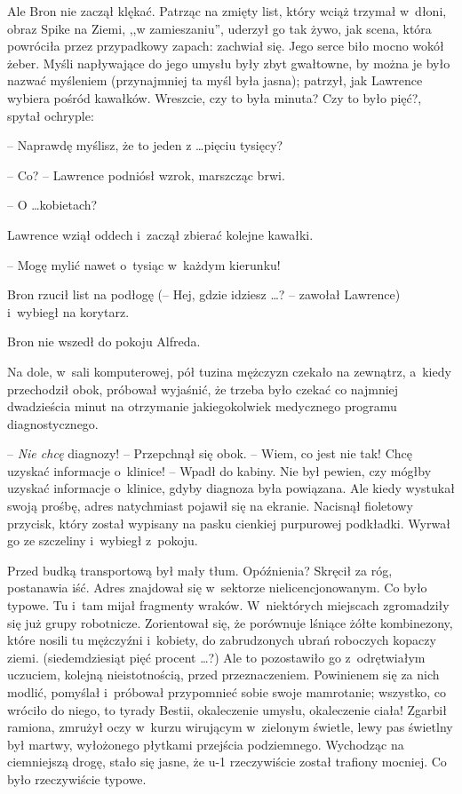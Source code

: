 \documentclass[oneside,polish,11pt,rmheadings]{mwbk}
\begin{document}
Ale Bron nie zaczął klękać. Patrząc na zmięty list, który wciąż trzymał w~dłoni, obraz Spike na Ziemi, ,,w zamieszaniu'', uderzył go tak żywo, jak scena, która powróciła przez przypadkowy zapach: zachwiał się. Jego serce biło mocno wokół żeber. Myśli napływające do jego umysłu były zbyt gwałtowne, by można je było nazwać myśleniem (przynajmniej ta myśl była jasna); patrzył, jak Lawrence wybiera pośród kawałków. Wreszcie, czy to była minuta? Czy to było pięć?, spytał ochryple: 

-- Naprawdę myślisz, że to jeden z \ldots  pięciu tysięcy? 

-- Co? -- Lawrence podniósł wzrok, marszcząc brwi.  

-- O \ldots  kobietach?   

Lawrence wziął oddech i~zaczął zbierać kolejne kawałki. 

-- Mogę mylić nawet o~tysiąc w~każdym kierunku!  

Bron rzucił list na podłogę (-- Hej, gdzie idziesz \ldots ? -- zawołał Lawrence) i~wybiegł na korytarz. 

Bron nie wszedł do pokoju Alfreda. 

Na dole, w~sali komputerowej, pół tuzina mężczyzn czekało na zewnątrz, a~kiedy przechodził obok, próbował wyjaśnić, że trzeba było czekać co najmniej dwadzieścia minut na otrzymanie jakiegokolwiek medycznego programu diagnostycznego. 

-- \textit{Nie chcę }diagnozy! --  Przepchnął się obok. --  Wiem, co jest nie tak! Chcę uzyskać informacje o~klinice! -- Wpadł do kabiny. Nie był pewien, czy mógłby uzyskać informacje o~klinice, gdyby diagnoza była powiązana. Ale kiedy wystukał swoją prośbę, adres natychmiast pojawił się na ekranie. Nacisnął fioletowy przycisk, który został wypisany na pasku cienkiej purpurowej podkładki. Wyrwał go ze szczeliny i~wybiegł z~pokoju. 

Przed budką transportową był mały tłum.  Opóźnienia? Skręcił za róg, postanawia iść. Adres znajdował się w~sektorze nielicencjonowanym. Co było typowe. Tu i~tam mijał fragmenty wraków. W~niektórych miejscach zgromadziły się już grupy robotnicze. Zorientował się, że porównuje lśniące żółte kombinezony, które nosili tu mężczyźni i~kobiety, do zabrudzonych ubrań roboczych kopaczy ziemi. (siedemdziesiąt pięć procent \ldots ?) Ale to pozostawiło go z~odrętwiałym uczuciem, kolejną nieistotnością,  przed przeznaczeniem. Powinienem się za nich modlić, pomyślał i~próbował przypomnieć sobie swoje mamrotanie; wszystko, co wróciło do niego, to tyrady Bestii, okaleczenie umysłu, okaleczenie ciała! Zgarbił ramiona, zmrużył oczy w~kurzu wirującym w~zielonym świetle, lewy pas świetlny był martwy, wyłożonego płytkami przejścia podziemnego. Wychodząc na ciemniejszą drogę, stało się jasne, że u-1 rzeczywiście został trafiony mocniej. Co było rzeczywiście typowe. 
\end{document}
